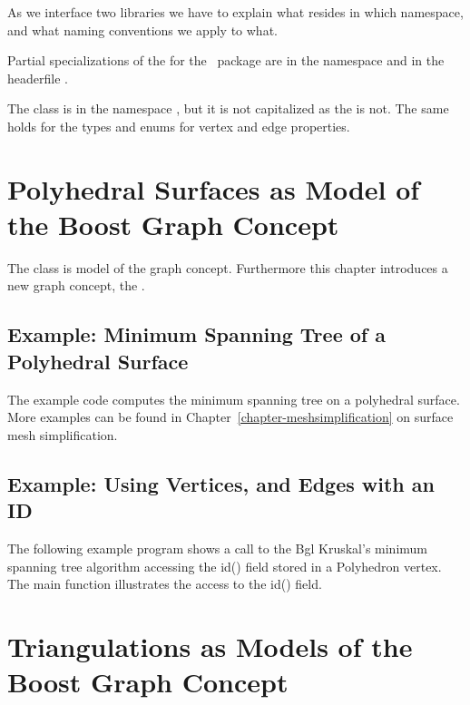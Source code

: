 As we interface two libraries we have to explain what resides in which namespace,
and what naming conventions we apply to what. 

Partial specializations of the  for the \cgal\ package
 are in the namespace  and in the headerfile .

The  class is in the namespace ,
but it is not capitalized as the  is not.
The same holds for the types and enums for vertex and edge properties.





\section{Polyhedral Surfaces as Model of the Boost Graph Concept}

The class  is model of the graph concept.  Furthermore
this chapter introduces a new graph concept, the .

\subsection{Example: Minimum Spanning Tree of a Polyhedral Surface}

The example code computes the minimum spanning tree on a polyhedral surface.
More examples can be found in Chapter~\ref{chapter-meshsimplification} on surface mesh simplification.




\subsection{Example: Using Vertices, and Edges with an ID}

The following example program shows a call to the {\sc Bgl} 
Kruskal's minimum spanning tree algorithm accessing the id() 
field stored in a Polyhedron vertex.\\
The main function illustrates the access to the id() field.




\section{Triangulations as Models of the Boost Graph Concept}

